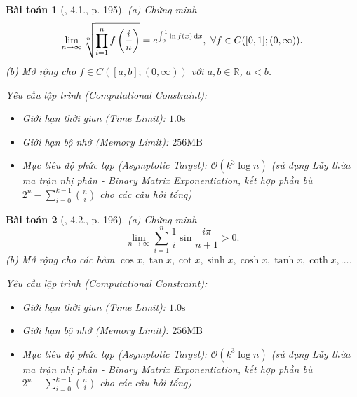 \documentclass{article}
\newtheorem{baitoan}{Bài toán}
\begin{document}
\begin{baitoan}[\cite{Quoc_Long_Dat_Nam_VMC}, 4.1., p. 195]
	(a) Chứng minh
	\begin{equation*}
		\lim_{n\to\infty} \sqrt[n]{\prod_{i=1}^n f\left(\frac{i}{n}\right)} = e^{\int_0^1 \ln f(x)\,{\rm d}x},\ \forall f\in C([0,1];(0,\infty)).
	\end{equation*}
	(b) Mở rộng cho $f\in C([a,b];(0,\infty))$ với $a,b\in\mathbb{R}$, $a < b$.

    \vspace{0.5em}
    \emph{Yêu cầu lập trình (Computational Constraint):}
    \begin{itemize}
        \item Giới hạn thời gian (Time Limit): $1.0\mathrm{s}$
        \item Giới hạn bộ nhớ (Memory Limit): $256\mathrm{MB}$
        \item Mục tiêu độ phức tạp (Asymptotic Target): $\mathcal{O}(k^3 \log n)$ (sử dụng Lũy thừa ma trận nhị phân - Binary Matrix Exponentiation, kết hợp phần bù $2^n - \sum_{i=0}^{k-1} \binom{n}{i}$ cho các câu hỏi tổng)
    \end{itemize}
\end{baitoan}


\begin{baitoan}[\cite{Quoc_Long_Dat_Nam_VMC}, 4.2., p. 196]
	(a) Chứng minh
	\begin{equation*}
		\lim_{n\to\infty} \sum_{i=1}^{n} \frac{1}{i}\sin\frac{i\pi}{n + 1} > 0.
	\end{equation*}
	(b) Mở rộng cho các hàm $\cos x,\tan x,\cot x,\sinh x,\cosh x,\tanh x,\coth x,\ldots$.

    \vspace{0.5em}
    \emph{Yêu cầu lập trình (Computational Constraint):}
    \begin{itemize}
        \item Giới hạn thời gian (Time Limit): $1.0\mathrm{s}$
        \item Giới hạn bộ nhớ (Memory Limit): $256\mathrm{MB}$
        \item Mục tiêu độ phức tạp (Asymptotic Target): $\mathcal{O}(k^3 \log n)$ (sử dụng Lũy thừa ma trận nhị phân - Binary Matrix Exponentiation, kết hợp phần bù $2^n - \sum_{i=0}^{k-1} \binom{n}{i}$ cho các câu hỏi tổng)
    \end{itemize}
\end{baitoan}
\end{document}
